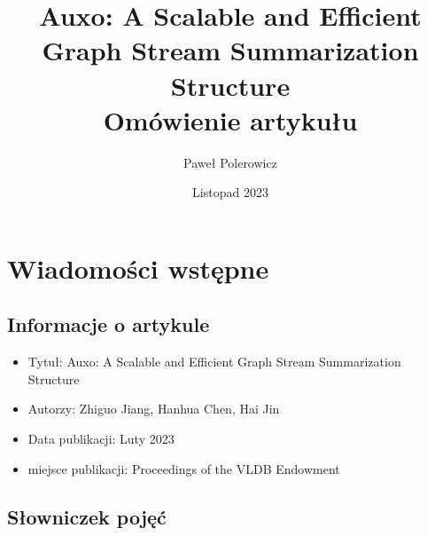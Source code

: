 \documentclass{article}
\title{\textbf{Auxo: A Scalable and Efficient Graph Stream Summarization Structure\\
    Omówienie artykułu}}
\author{Paweł Polerowicz}
\date{Listopad 2023}
\theoremstyle{definition}
\begin{document}
    \maketitle
    \section{Wiadomości wstępne}
    
    \subsection{Informacje o artykule}
    \begin{itemize}
        \item Tytuł: Auxo: A Scalable and Efficient Graph Stream Summarization Structure
        \item Autorzy: Zhiguo Jiang, Hanhua Chen, Hai Jin
        \item Data publikacji: Luty 2023
        \item miejsce publikacji: Proceedings of the VLDB Endowment
    \end{itemize}
    
    \subsection{Słowniczek pojęć}
\end{document}
